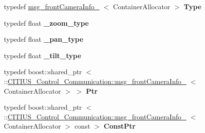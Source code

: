 \begin{DoxyCompactItemize}
\item 
\hypertarget{struct_c_i_t_i_u_s___control___communication_1_1msg__front_camera_info___aa54fc8689c4b5a44d68ff4f781670ce4}{typedef \hyperlink{struct_c_i_t_i_u_s___control___communication_1_1msg__front_camera_info__}{msg\-\_\-front\-Camera\-Info\-\_\-}\*
$<$ \-Container\-Allocator $>$ {\bfseries \-Type}}\label{struct_c_i_t_i_u_s___control___communication_1_1msg__front_camera_info___aa54fc8689c4b5a44d68ff4f781670ce4}

\item 
\hypertarget{struct_c_i_t_i_u_s___control___communication_1_1msg__front_camera_info___acbe473a42f59e0753b2d8f5d51de1e70}{typedef float {\bfseries \-\_\-zoom\-\_\-type}}\label{struct_c_i_t_i_u_s___control___communication_1_1msg__front_camera_info___acbe473a42f59e0753b2d8f5d51de1e70}

\item 
\hypertarget{struct_c_i_t_i_u_s___control___communication_1_1msg__front_camera_info___ac34d3a1f44fd4559534e8ae0176a085d}{typedef float {\bfseries \-\_\-pan\-\_\-type}}\label{struct_c_i_t_i_u_s___control___communication_1_1msg__front_camera_info___ac34d3a1f44fd4559534e8ae0176a085d}

\item 
\hypertarget{struct_c_i_t_i_u_s___control___communication_1_1msg__front_camera_info___aadcea44506df1e51fd61018b8506a099}{typedef float {\bfseries \-\_\-tilt\-\_\-type}}\label{struct_c_i_t_i_u_s___control___communication_1_1msg__front_camera_info___aadcea44506df1e51fd61018b8506a099}

\item 
\hypertarget{struct_c_i_t_i_u_s___control___communication_1_1msg__front_camera_info___adcbb90279e515c0c7a9a9c3c68093d9b}{typedef boost\-::shared\-\_\-ptr\*
$<$ \-::\hyperlink{struct_c_i_t_i_u_s___control___communication_1_1msg__front_camera_info__}{\-C\-I\-T\-I\-U\-S\-\_\-\-Control\-\_\-\-Communication\-::msg\-\_\-front\-Camera\-Info\-\_\-}\*
$<$ \-Container\-Allocator $>$ $>$ {\bfseries \-Ptr}}\label{struct_c_i_t_i_u_s___control___communication_1_1msg__front_camera_info___adcbb90279e515c0c7a9a9c3c68093d9b}

\item 
\hypertarget{struct_c_i_t_i_u_s___control___communication_1_1msg__front_camera_info___a4a3dff646e5c0c5b10e9801bfd0c39e7}{typedef boost\-::shared\-\_\-ptr\*
$<$ \-::\hyperlink{struct_c_i_t_i_u_s___control___communication_1_1msg__front_camera_info__}{\-C\-I\-T\-I\-U\-S\-\_\-\-Control\-\_\-\-Communication\-::msg\-\_\-front\-Camera\-Info\-\_\-}\*
$<$ \-Container\-Allocator $>$ const  $>$ {\bfseries \-Const\-Ptr}}\label{struct_c_i_t_i_u_s___control___communication_1_1msg__front_camera_info___a4a3dff646e5c0c5b10e9801bfd0c39e7}

\end{DoxyCompactItemize}
